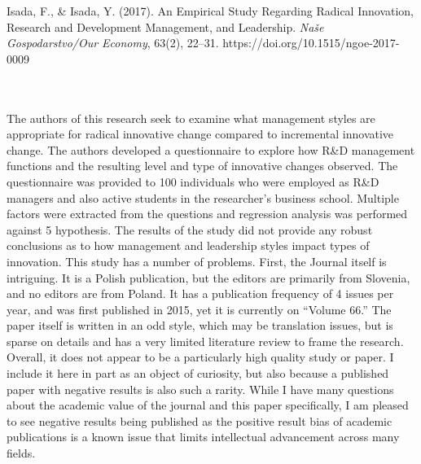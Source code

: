 \documentclass{apa7}
\begin{document}
\bigskip
\hfill\begin{minipage}{\dimexpr\textwidth-1in}
\begin{hangparas}{.25in}{1}
Isada, F., \& Isada, Y. (2017). An Empirical Study Regarding Radical Innovation, Research and Development Management, and Leadership. \textit{Naše Gospodarstvo/Our Economy}, 63(2), 22–31. https://doi.org/10.1515/ngoe-2017-0009
\end{hangparas}
\xdef\tpd{\the\prevdepth}
\end{minipage}
\\
\\
The authors of this research seek to examine what management styles are appropriate for radical innovative change compared to incremental innovative change. The authors developed a questionnaire to explore how R\&D management functions and the resulting level and type of innovative changes observed. The questionnaire was provided to 100 individuals who were employed as R\&D managers and also active students in the researcher's business school. Multiple factors were extracted from the questions and regression analysis was performed against 5 hypothesis. The results of the study did not provide any robust conclusions as to how management and leadership styles impact types of innovation. This study has a number of problems. First, the Journal itself is intriguing. It is a Polish publication, but the editors are primarily from Slovenia, and no editors are from Poland. It has a publication frequency of 4 issues per year, and was first published in 2015, yet it is currently on ``Volume 66.''  The paper itself is written in an odd style, which may be translation issues, but is sparse on details and has a very limited literature review to frame the research. Overall, it does not appear to be a particularly high quality study or paper. I include it here in part as an object of curiosity, but also because a published paper with negative results is also such a rarity. While I have many questions about the academic value of the journal and this paper specifically, I am pleased to see negative results being published as the positive result bias of academic publications is a known issue that limits intellectual advancement across many fields.



\bigskip
\hfill\begin{minipage}{\dimexpr\textwidth-1in}
\begin{hangparas}{.25in}{1}

\end{hangparas}
\xdef\tpd{\the\prevdepth}
\end{minipage}
\\
\\
\end{document}
